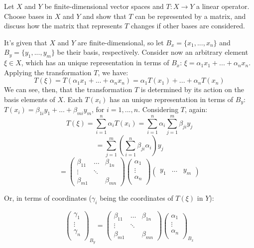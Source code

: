 \documentclass{article}
\theoremstyle{remark}
\newenvironment{exercise}[1]
  {\renewcommand\theinnerex{#1}\innerex}
  {\endinnerex}
\begin{document}
\begin{exercise}{1.1.9}
    Let $X$ and $Y$ be finite-dimensional vector spaces and $T : X \to Y$
    a linear operator. Choose bases in $X$ and $Y$ and show that $T$ can be represented
    by a matrix, and discuss how the matrix that represents $T$ changes if other bases
    are considered.

    It's given that $X$ and $Y$ are finite-dimensional, so let $B_x = \{ x_1, ..., x_n \}$ and $B_y = \{y_1, ..., y_m\}$ be their basis, respectively.
    Consider now an arbitrary element $\xi \in X$, which has an unique representation in terms of $B_x$: $\xi = \alpha_1 x_1 + ... + \alpha_n x_n$.
    Applying the transformation $T$, we have:
    $$ T(\xi) = T(\alpha_1 x_1 + ... + \alpha_n x_n) = \alpha_1 T(x_1) + ... + \alpha_n T(x_n)$$
    We can see, then, that the transformation $T$ is determined by its action on the basis elements of $X$. Each $T(x_i)$ has an unique representation in terms of $B_y$:
    $T(x_i) = \beta_{1i} y_1 + ... + \beta_{mi} y_m$, for $i = 1, ..., n$.
    Considering $T$, again:
    $$ T(\xi) = \sum_{i=1}^n \alpha_i T(x_i) = \sum_{i=1}^n \alpha_i  \sum_{j=1}^m  \beta_{ji} y_j $$
    $$ = \sum_{j=1}^m ( \sum_{i=1}^n  \beta_{ji} \alpha_i ) y_j $$
    \[ = \begin{pmatrix}
            \beta_{11} & \dots  & \beta_{1n} \\
            \vdots     & \ddots &            \\
            \beta_{m1} &        & \beta_{mn}
        \end{pmatrix}
        \begin{pmatrix}
            \alpha_{1} \\
            \vdots     \\
            \alpha_{n} \\
        \end{pmatrix}
        \begin{pmatrix}
            y_1 & \dots & y_m
        \end{pmatrix}
    \]

    Or, in terms of coordinates ($\gamma_i$ being the coordinates of $T(\xi)$ in $Y$):

    \[ \begin{pmatrix}
            \gamma_{1} \\
            \vdots     \\
            \gamma_{n} \\
        \end{pmatrix}_{B_y}
        = \begin{pmatrix}
            \beta_{11} & \dots  & \beta_{1n} \\
            \vdots     & \ddots &            \\
            \beta_{m1} &        & \beta_{mn}
        \end{pmatrix}
        \begin{pmatrix}
            \alpha_{1} \\
            \vdots     \\
            \alpha_{n} \\
        \end{pmatrix}_{B_x}
    \]


\end{exercise}
\end{document}
